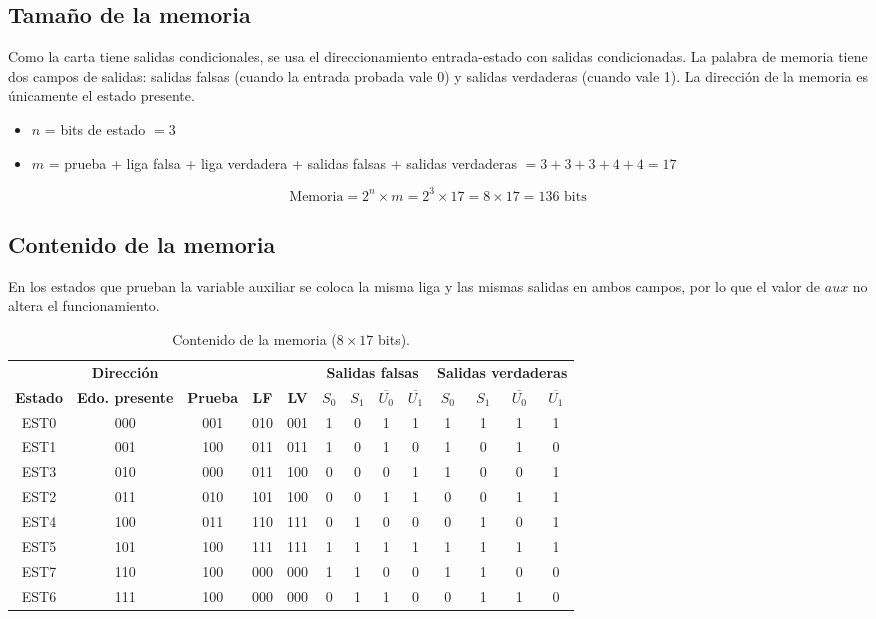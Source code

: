 \documentclass[11pt,letterpaper]{article}
\newcommand{\nb}[1]{\overline{#1}}
\begin{document}
\subsection{Tamaño de la memoria}

Como la carta tiene salidas condicionales, se usa el direccionamiento entrada-estado con salidas condicionadas. La palabra de memoria tiene dos campos de salidas: salidas falsas (cuando la entrada probada vale 0) y salidas verdaderas (cuando vale 1). La dirección de la memoria es únicamente el estado presente.

\begin{itemize}
  \item $n$ = bits de estado $= 3$
  \item $m$ = prueba + liga falsa + liga verdadera + salidas falsas + salidas verdaderas $= 3 + 3 + 3 + 4 + 4 = 17$
\end{itemize}

\[
\text{Memoria} = 2^n \times m = 2^3 \times 17 = 8 \times 17 = 136 \text{ bits}
\]

\subsection{Contenido de la memoria}

En los estados que prueban la variable auxiliar se coloca la misma liga y las mismas salidas en ambos campos, por lo que el valor de $aux$ no altera el funcionamiento.

\begin{table}[H]
\centering
\setlength{\tabcolsep}{5pt}
\begin{tabular}{c|c|c|c|c|cccc|cccc}
\toprule
 & \textbf{Dirección} & & & & \multicolumn{4}{c|}{\textbf{Salidas falsas}} & \multicolumn{4}{c}{\textbf{Salidas verdaderas}} \\
\textbf{Estado} & \textbf{Edo. presente} & \textbf{Prueba} & \textbf{LF} & \textbf{LV} & $S_0$ & $S_1$ & $\nb{U_0}$ & $\nb{U_1}$ & $S_0$ & $S_1$ & $\nb{U_0}$ & $\nb{U_1}$ \\
\midrule
EST0 & 000 & 001 & 010 & 001 & 1 & 0 & 1 & 1 & 1 & 1 & 1 & 1 \\
EST1 & 001 & 100 & 011 & 011 & 1 & 0 & 1 & 0 & 1 & 0 & 1 & 0 \\
EST3 & 010 & 000 & 011 & 100 & 0 & 0 & 0 & 1 & 1 & 0 & 0 & 1 \\
EST2 & 011 & 010 & 101 & 100 & 0 & 0 & 1 & 1 & 0 & 0 & 1 & 1 \\
EST4 & 100 & 011 & 110 & 111 & 0 & 1 & 0 & 0 & 0 & 1 & 0 & 1 \\
EST5 & 101 & 100 & 111 & 111 & 1 & 1 & 1 & 1 & 1 & 1 & 1 & 1 \\
EST7 & 110 & 100 & 000 & 000 & 1 & 1 & 0 & 0 & 1 & 1 & 0 & 0 \\
EST6 & 111 & 100 & 000 & 000 & 0 & 1 & 1 & 0 & 0 & 1 & 1 & 0 \\
\bottomrule
\end{tabular}
\caption{Contenido de la memoria ($8 \times 17$ bits).}
\label{tab:memoria}
\end{table}
\end{document}
